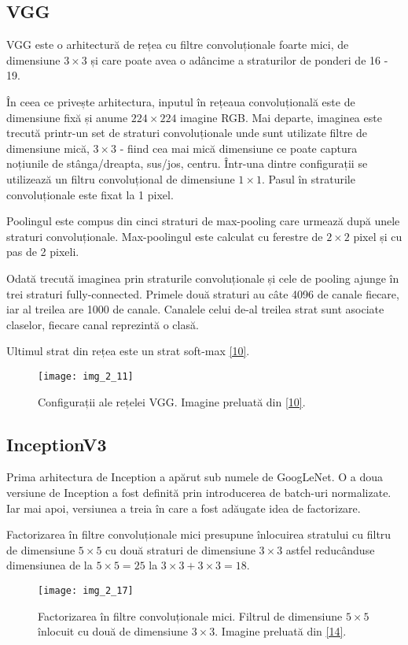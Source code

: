 \subsection{VGG}

VGG este o arhitectură de rețea cu filtre convoluționale foarte mici, de dimensiune $3\times3$ și care poate avea o adâncime a straturilor de ponderi de 16 - 19.

În ceea ce privește arhitectura, inputul în rețeaua convoluțională este de dimensiune fixă și anume $224\times224$ imagine RGB. Mai departe, imaginea este trecută printr-un set de straturi convoluționale unde sunt utilizate filtre de dimensiune mică, $3\times3$ - fiind cea mai mică dimensiune ce poate captura noțiunile de stânga/dreapta, sus/jos, centru. Într-una dintre configurații se utilizează un filtru convoluțional de dimensiune $1\times1$. Pasul în straturile convoluționale este fixat la 1 pixel.

Poolingul este compus din cinci straturi de max-pooling care urmează după unele straturi convoluționale. Max-poolingul este calculat cu ferestre de $2\times2$ pixel și cu pas de 2 pixeli.

Odată trecută imaginea prin straturile convoluționale și cele de pooling ajunge în trei straturi fully-connected. Primele două straturi au câte 4096 de canale fiecare, iar al treilea are 1000 de canale. Canalele celui de-al treilea strat sunt asociate claselor, fiecare canal reprezintă o clasă.

Ultimul strat din rețea este un strat soft-max \hyperlink{SimonyanKarenZissermanAndrew}{[10]}.

\begin{figure}[!h]
	\centering
	\texttt{[image: img\_2\_11]}
	\caption[Configurații VGG]{Configurații ale rețelei VGG. Imagine preluată din \hyperlink{SimonyanKarenZissermanAndrew}{[10]}.}
\end{figure}   

\subsection{InceptionV3}
Prima arhitectura de Inception a apărut sub numele de GoogLeNet. O a doua versiune de Inception a fost definită prin introducerea de batch-uri normalizate. Iar mai apoi, versiunea a treia în care a fost adăugate idea de factorizare.

Factorizarea în filtre convoluționale mici presupune înlocuirea stratului cu filtru de dimensiune $5 \times 5$ cu două straturi de dimensiune $3 \times 3$ astfel reducânduse dimensiunea de la $5 \times 5 = 25$ la $3 \times 3 + 3 \times 3 = 18$.
\begin{figure}[!h]
	\centering
	\texttt{[image: img\_2\_17]}
	\caption[Factorizarea în filtre convoluționale mici]{Factorizarea în filtre convoluționale mici. Filtrul de dimensiune $5 \times 5$ înlocuit cu două de dimensiune $3 \times 3$.  Imagine preluată din \hyperlink{guideinceptionv3}{[14]}.}
\end{figure}   

